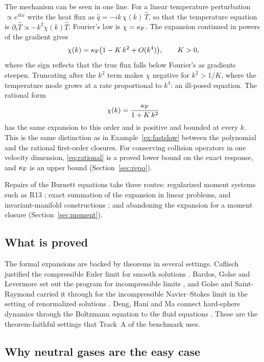 The mechanism can be seen in one line. For a linear temperature
perturbation $\propto e^{ikx}$ write the heat flux as
$\hat q=-ik\,\chi(k)\,\hat T$, so that the temperature equation is
$\partial_t\hat T\propto-k^2\chi(k)\hat T$. Fourier's law is
$\chi=\kappa_{\mathrm F}$. The expansion continued in powers of the gradient gives
\begin{equation}
  \chi(k)=\kappa_{\mathrm F}\bigl(1-K\,k^2+O(k^4)\bigr),\qquad K>0,
  \label{eq:deficit}
\end{equation}
where the sign reflects that the true flux falls below Fourier's as
gradients steepen. Truncating after the $k^2$ term makes $\chi$ negative for
$k^2>1/K$, where the temperature mode grows at a rate proportional to
$k^4$: an ill-posed equation. The rational form
\begin{equation}
  \chi(k)=\frac{\kappa_{\mathrm F}}{1+K\,k^2}
  \label{eq:rational}
\end{equation}
has the same expansion to this order and is positive and bounded at every
$k$. This is the same distinction as in Example~\ref{ex:fastslow} between
the polynomial and the rational first-order closures. For conserving
collision operators in one velocity dimension, \eqref{eq:rational} is a
proved lower bound on the exact response, and $\kappa_{\mathrm F}$ is an upper bound
(Section~\ref{sec:repo}).

Repairs of the Burnett equations take three routes: regularized moment
systems such as R13 \cite{StruchtrupTorrilhon03,Struchtrup05}; exact
summation of the expansion in linear problems, and invariant-manifold
constructions \cite{GorbanKarlin14,KogelbauerKarlin24}; and abandoning the
expansion for a moment closure (Section~\ref{sec:moment}).

\subsection{What is proved}

The formal expansions are backed by theorems in several settings. Caflisch
justified the compressible Euler limit for smooth solutions
\cite{Caflisch80}. Bardos, Golse and Levermore set out the program for
incompressible limits \cite{BGL91}, and Golse and Saint-Raymond carried it
through for the incompressible Navier--Stokes limit in the setting of
renormalized solutions \cite{GSR04}. Deng, Hani and Ma connect hard-sphere
dynamics through the Boltzmann equation to the fluid equations
\cite{DHM25}. These are the theorem-faithful settings that Track~A of the
benchmark uses.

\subsection{Why neutral gases are the easy case}
\label{sec:easy}


